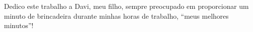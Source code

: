 \vspace*{15cm}

\hfill Dedico este trabalho a Davi, meu filho, sempre preocupado em 
proporcionar um minuto de brincadeira durante minhas horas de trabalho, 
``meus melhores minutos''! \\